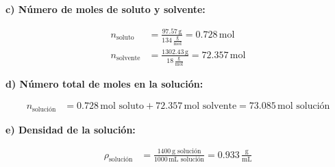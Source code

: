 \documentclass{article}
\begin{document}
\begin{multicols}{2}
\textbf{c) Número de moles de soluto y solvente:}

\begin{align*}
    n_{\text{soluto}} &= \frac{97.57 \, \text{g}}{134 \, \frac{\text{g}}{\text{mol}}} = 0.728 \, \text{mol} \\[10pt]
    n_{\text{solvente}} &= \frac{1302.43 \, \text{g}}{18 \, \frac{\text{g}}{\text{mol}}} = 72.357 \, \text{mol}
\end{align*}

\textbf{d) Número total de moles en la solución:}

\begin{align*}
    n_{\text{solución}} &= 0.728 \, \text{mol soluto} + 72.357 \, \text{mol solvente} = 73.085 \, \text{mol solución}
\end{align*}

\textbf{e) Densidad de la solución:}

\begin{align*}
    \rho_{\text{solución}} &= \frac{1400 \, \text{g solución}}{1000 \, \text{mL solución}} = 0.933 \, \frac{\text{g}}{\text{mL}}
\end{align*}

\end{multicols} %
\end{document}
